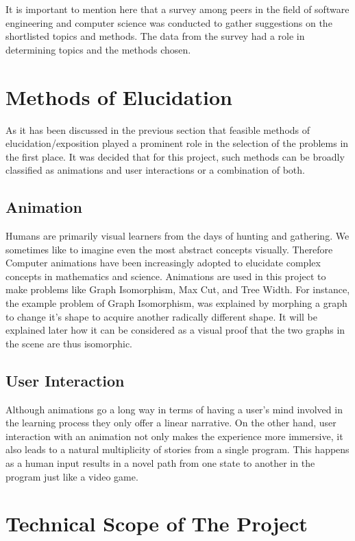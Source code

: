 It is important to mention here that a survey among
peers in the field of software engineering and computer science was conducted to 
gather suggestions on the shortlisted topics and methods.
The data from the survey had a role in determining topics and the methods chosen.


\section{Methods of Elucidation}
As it has been discussed in the previous section that feasible methods of
elucidation/exposition played a prominent role in the selection of the problems
in the first place. It was decided that for this project, such methods can be
broadly classified as animations and user interactions or a combination of
both.


\subsection{Animation}

Humans are primarily visual learners from the days of hunting and gathering. We
sometimes like to imagine even the most abstract concepts visually. Therefore
Computer animations have been increasingly adopted to elucidate complex
concepts in mathematics and science.  Animations are used in this project to
make problems like Graph Isomorphism, Max Cut, and Tree Width.  For instance,
the example problem of Graph Isomorphism, was explained by morphing a graph to
change it's shape to acquire another radically different shape. It will be
explained later how it can be considered as a visual proof that the two graphs
in the scene are thus isomorphic.

\subsection{User Interaction}
Although animations go a long way in terms of having a user's mind involved in
the learning process they only offer a linear narrative. On the other hand,
user interaction with an animation not only makes the experience more
immersive, it also leads to a natural multiplicity of stories from a single
program. This happens as a human input results in a novel path from one state
to another in the program just like a video game.


\section{Technical Scope of The Project}
\label{requirements: techScope}

